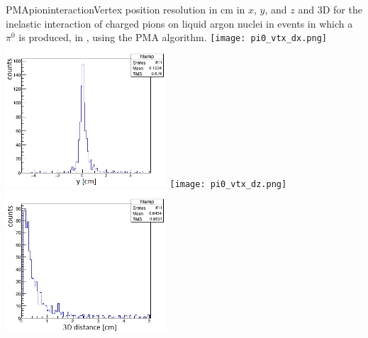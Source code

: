\begin{cdrfigure}{PMApioninteraction}{Vertex position resolution in cm in $x$, $y$, and $z$ and 3D for the
  inelastic interaction of charged pions on liquid argon nuclei in events in which a $\pi^0$ is produced, in
  \pdsp, using the PMA algorithm.}
\texttt{[image: pi0\_vtx\_dx.png]}\includegraphics[width=0.45\textwidth]{figures/pi0_vtx_dy.png}
\texttt{[image: pi0\_vtx\_dz.png]}\includegraphics[width=0.45\textwidth]{figures/pi0_vtx3d.png}
\end{cdrfigure}


